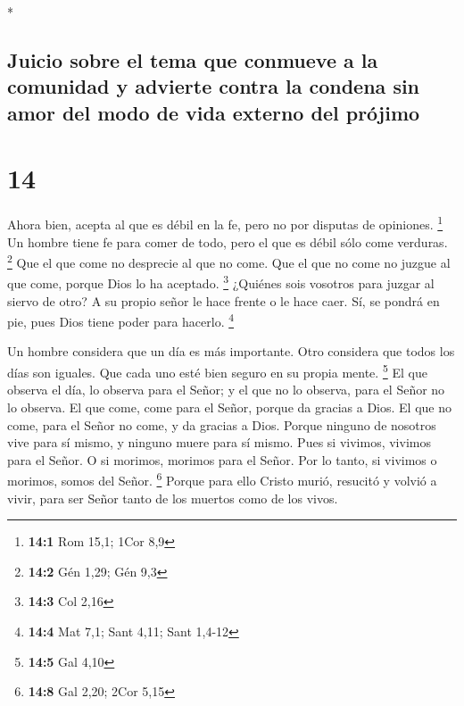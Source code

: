 \begin{paracol}{2}
\begin{otherlanguage}{english}
\end{otherlanguage}

\switchcolumn[0]*

\hypertarget{juicio-sobre-el-tema-que-conmueve-a-la-comunidad-y-advierte-contra-la-condena-sin-amor-del-modo-de-vida-externo-del-pruxf3jimo}{%
\subsection{Juicio sobre el tema que conmueve a la comunidad y advierte
contra la condena sin amor del modo de vida externo del
prójimo}\label{juicio-sobre-el-tema-que-conmueve-a-la-comunidad-y-advierte-contra-la-condena-sin-amor-del-modo-de-vida-externo-del-pruxf3jimo}}

\hypertarget{section-26}{%
\section{14}\label{section-26}}

 Ahora bien, acepta al que es débil en la fe, pero no por
disputas de opiniones. \footnote{\textbf{14:1} Rom 15,1; 1Cor 8,9}
 Un hombre tiene fe para comer de todo, pero el que es
débil sólo come verduras. \footnote{\textbf{14:2} Gén 1,29; Gén 9,3}
 Que el que come no desprecie al que no come. Que el que
no come no juzgue al que come, porque Dios lo ha aceptado. \footnote{\textbf{14:3}
  Col 2,16}  ¿Quiénes sois vosotros para juzgar al siervo
de otro? A su propio señor le hace frente o le hace caer. Sí, se pondrá
en pie, pues Dios tiene poder para hacerlo. \footnote{\textbf{14:4} Mat
  7,1; Sant 4,11; Sant 1,4-12}

 Un hombre considera que un día es más importante. Otro
considera que todos los días son iguales. Que cada uno esté bien seguro
en su propia mente. \footnote{\textbf{14:5} Gal 4,10}  El
que observa el día, lo observa para el Señor; y el que no lo observa,
para el Señor no lo observa. El que come, come para el Señor, porque da
gracias a Dios. El que no come, para el Señor no come, y da gracias a
Dios.  Porque ninguno de nosotros vive para sí mismo, y
ninguno muere para sí mismo.  Pues si vivimos, vivimos
para el Señor. O si morimos, morimos para el Señor. Por lo tanto, si
vivimos o morimos, somos del Señor. \footnote{\textbf{14:8} Gal 2,20;
  2Cor 5,15}  Porque para ello Cristo murió, resucitó y
volvió a vivir, para ser Señor tanto de los muertos como de los vivos.


\end{paracol}
